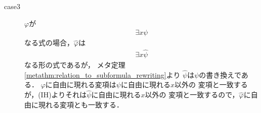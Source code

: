 \begin{metaprf}
\begin{description}
\begin{description}
					\item[case3] $\varphi$が
						\begin{align}
							\exists x \psi
						\end{align}
						なる式の場合，$\widehat{\varphi}$は
						\begin{align}
							\exists x \widehat{\psi}
						\end{align}
						なる形の式であるが，
						メタ定理\ref{metathm:relation_to_subformula_rewriting}より
						$\widehat{\psi}$は$\psi$の書き換えである．
						$\varphi$に自由に現れる変項は$\psi$に自由に現れる$x$以外の
						変項と一致するが，(IH)よりそれは$\widehat{\psi}$に自由に現れる$x$以外の
						変項と一致するので，$\widehat{\varphi}$に自由に現れる変項とも一致する．
						\QED
				\end{description}
		\end{description}
	\end{metaprf}